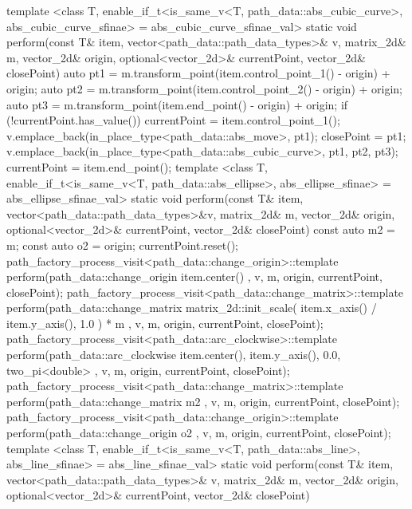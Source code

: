 \begin{codeblock}
{{      template <class T, enable_if_t<is_same_v<T, path_data::abs_cubic_curve>,
        abs_cubic_curve_sfinae> = abs_cubic_curve_sfinae_val>
      static void perform(const T& item, vector<path_data::path_data_types>& v,
        matrix_2d& m, vector_2d& origin, optional<vector_2d>& currentPoint,
        vector_2d& closePoint) {
        auto pt1 = m.transform_point(item.control_point_1() - origin) + origin;
        auto pt2 = m.transform_point(item.control_point_2() - origin) + origin;
        auto pt3 = m.transform_point(item.end_point() - origin) + origin;
        if (!currentPoint.has_value()) {
          currentPoint = item.control_point_1();
          v.emplace_back(in_place_type<path_data::abs_move>, pt1);
          closePoint = pt1;
        }
        v.emplace_back(in_place_type<path_data::abs_cubic_curve>, pt1,
          pt2, pt3);
        currentPoint = item.end_point();
      }
      template <class T, enable_if_t<is_same_v<T,
        path_data::abs_ellipse>, abs_ellipse_sfinae> = abs_ellipse_sfinae_val>
      static void perform(const T& item, vector<path_data::path_data_types>&v,
        matrix_2d& m, vector_2d& origin, optional<vector_2d>& currentPoint, 
        vector_2d& closePoint) {
        const auto m2 = m;
        const auto o2 = origin;
        currentPoint.reset();
        path_factory_process_visit<path_data::change_origin>::template 
          perform(path_data::change_origin{ item.center() }, v, m, origin, 
          currentPoint, closePoint);
        path_factory_process_visit<path_data::change_matrix>::template 
          perform(path_data::change_matrix{ matrix_2d::init_scale({ 
          item.x_axis() / item.y_axis(), 1.0 }) * m }, v, m, origin, 
          currentPoint, closePoint);
        path_factory_process_visit<path_data::arc_clockwise>::template 
          perform(path_data::arc_clockwise{ item.center(), item.y_axis(), 0.0, 
          two_pi<double> }, v, m, origin, currentPoint, closePoint);
        path_factory_process_visit<path_data::change_matrix>::template 
          perform(path_data::change_matrix{ m2 }, v, m, origin, currentPoint, 
          closePoint);
        path_factory_process_visit<path_data::change_origin>::template 
          perform(path_data::change_origin{ o2 }, v, m, origin, currentPoint, 
          closePoint);
      }
      template <class T, enable_if_t<is_same_v<T, path_data::abs_line>, 
        abs_line_sfinae> = abs_line_sfinae_val>
      static void perform(const T& item, vector<path_data::path_data_types>& v, 
        matrix_2d& m, vector_2d& origin, optional<vector_2d>& currentPoint, 
        vector_2d& closePoint) {
}}}
\end{codeblock}
